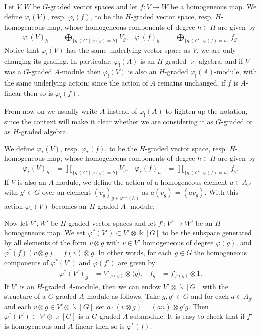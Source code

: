 \documentclass[11pt,fleqn]{article}
\newcommand\ot{\otimes}
\renewcommand\to{\longrightarrow}
\renewcommand\phi{\varphi}
\renewcommand\k{\Bbbk}
\begin{document}
Let $V,W$ be $G$-graded vector spaces and let $f: V \to W$ be a homogeneous 
map. We define $\phi_!(V)$, resp. $\phi_!(f)$, to be the $H$-graded vector 
space, resp. $H$-homogeneous map, whose homogeneous components of degree
$h \in H$ are given by
\begin{align*}
\phi_!(V)_h
  &= \bigoplus_{\{g \in G \mid \phi(g) = h\}} V_g,
&\phi_!(f)_h
  &= \bigoplus_{\{g \in G \mid \phi(f) = h\}} f_g.
\end{align*}
Notice that $\phi_!(V)$ has the same underlying vector space as $V$, we are
only changing its grading. In particular, $\phi_!(A)$ is an $H$-graded 
$\k$-algebra, and if $V$ was a $G$-graded $A$-module then $\phi_!(V)$ is also 
an $H$-graded $\phi_!(A)$-module, with the same underlying action; since the
action of $A$ remains unchanged, if $f$ is $A$-linear then so is $\phi_!(f)$.

From now on we usually write $A$ instead of $\phi_!(A)$ to lighten up the 
notation, since the context will make it clear whether we are considering it 
as $G$-graded or as $H$-graded algebra.

We define $\phi_*(V)$, resp. $\phi_*(f)$, to be the $H$-graded 
vector space, resp. $H$-homogeneous map, whose homogeneous components of degree
$h \in H$ are given by
\begin{align*}
\phi_*(V)_h
  &= \prod_{\{g \in G \mid \phi(g) = h\}} V_g,
&\phi_*(f)_h
  &= \prod_{\{g \in G \mid \phi(f) = h\}} f_g.
\end{align*}
If $V$ is also an $A$-module, we define the action of a homogeneous element 
$a \in A_{g'}$ with $g' \in G$ over an element $(v_g)_{g \in \phi^{-1}(h)}$
as $a(v_g) = (av_g)$. With this action $\phi_*(V)$ becomes an $H$-graded $A$-
module.

Now let $V',W'$ be $H$-graded vector spaces and let $f': V' \to W'$ be an 
$H$-homogeneous map. We set $\phi^*(V') \subset V' \ot \k[G]$ to be the 
subspace generated by all elements of the form $v \ot g$ with $v \in V'$ 
homogeneous of degree $\phi(g)$, and $\phi^*(f)(v \ot g) = f(v) \ot g$. In 
other words, for each $g \in G$ the homogeneous components of $\phi^*(V')$
and $\phi(f')$ are given by
\begin{align*}
\phi^*(V')_g 
  &=  V'_{\phi(g)} \ot \langle g \rangle,
  &f_g
  &= f_{\phi(g)} \ot 1.
\end{align*}
If $V'$ is an $H$-graded $A$-module, then we can endow $V' \ot \k[G]$ with
the structure of a $G$-graded $A$-module as follows. Take $g,g' \in G$ and  
for each $a \in A_{g'}$ and each $v \ot g \in V' \ot \k[G]$ set $a \cdot 
(v \ot g) = (an) \ot g'g$. Then $\phi^*(V') \subset V' \ot \k[G]$ is a
$G$-graded $A$-submodule. It is easy to check that if $f'$ is homogeneous and 
$A$-linear then so is $\phi^*(f)$.
\end{document}
